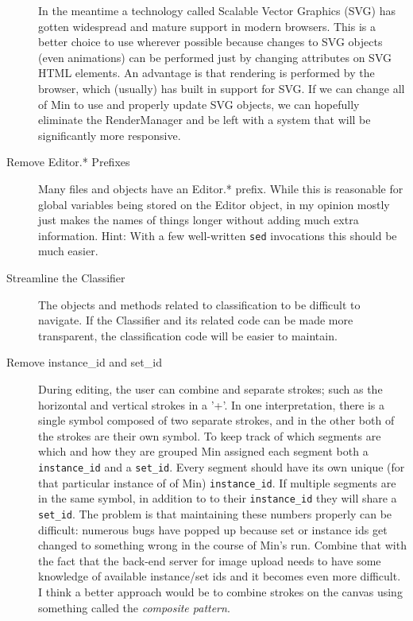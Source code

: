\documentclass[letterpaper]{article}
\begin{document}
\begin{description}
        In the meantime a technology called Scalable Vector Graphics (SVG) has
        gotten widespread and mature support in modern browsers. This is a
        better choice to use wherever possible because changes to SVG objects
        (even animations) can be performed just by changing attributes on SVG
        HTML elements. An advantage is that rendering is performed by the
        browser, which (usually) has built in support for SVG. If we can change
        all of Min to use and properly update SVG objects, we can hopefully
        eliminate the RenderManager and be left with a system that will be
        significantly  more responsive.
    \item[Remove Editor.* Prefixes] Many files and objects have an Editor.*
        prefix. While this is reasonable for global variables being stored on
        the Editor object, in my opinion mostly just makes the names of things longer
        without adding much extra information. Hint: With a few well-written
        \verb+sed+ invocations this should be much easier.
    \item[Streamline the Classifier] The objects and methods related to
        classification to be difficult to navigate. If the Classifier and its
        related code can be made more transparent, the classification code will
        be easier to maintain.
    \item[Remove instance\_id and set\_id] During editing, the
        user can combine and separate strokes; such as the horizontal and
        vertical strokes in a '+'. In one interpretation, there is a single
        symbol composed of two separate strokes, and in the other both of the
        strokes are their own symbol. To keep track of which segments are which
        and how they are grouped Min assigned each segment both a
        \verb+instance_id+ and a \verb+set_id+. Every segment should have its own
        unique (for that particular instance of of Min) \verb+instance_id+. If multiple segments are in the
        same symbol, in addition to to their \verb+instance_id+ they will share
        a \verb+set_id+. The problem is that maintaining these numbers properly
        can be difficult: numerous bugs have popped up because set or instance
        ids get changed to something wrong in the course of Min's run. Combine
        that with the fact that the back-end server for image upload needs to
        have some knowledge of available instance/set ids and it becomes even
        more difficult. I think a better approach would be to combine strokes on
        the canvas using something called the \emph{composite pattern}.

\end{description}
\end{document}
